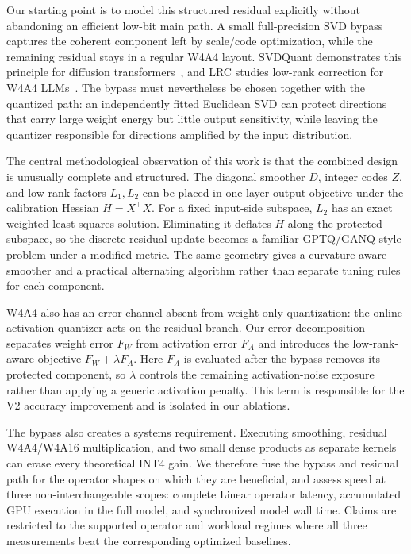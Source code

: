 \documentclass{article}
\begin{document}
Our starting point is to model this structured residual explicitly without
abandoning an efficient low-bit main path. A small full-precision SVD bypass
captures the coherent component left by scale/code optimization, while the
remaining residual stays in a regular W4A4 layout. SVDQuant demonstrates this principle
for diffusion transformers~\citep{li2024svdquant}, and LRC studies low-rank
correction for W4A4 LLMs~\citep{scetbon2024lrc}. The bypass must nevertheless be
chosen together with the quantized path: an independently fitted Euclidean SVD
can protect directions that carry large weight energy but little output
sensitivity, while leaving the quantizer responsible for directions amplified
by the input distribution.

The central methodological observation of this work is that the combined design
is unusually complete and structured. The diagonal smoother $D$, integer codes
$Z$, and low-rank factors $L_1,L_2$ can be placed in one layer-output objective
under the calibration Hessian $H=X^\top X$. For a fixed input-side subspace,
$L_2$ has an exact weighted least-squares solution. Eliminating it deflates $H$
along the protected subspace, so the discrete residual update becomes a familiar
GPTQ/GANQ-style problem under a modified metric. The same geometry gives a
curvature-aware smoother and a practical alternating algorithm rather than
separate tuning rules for each component.

W4A4 also has an error channel absent from weight-only quantization: the online
activation quantizer acts on the residual branch. Our error decomposition
separates weight error $F_W$ from activation error $F_A$ and introduces the
low-rank-aware objective $F_W+\lambda F_A$. Here $F_A$ is evaluated after the
bypass removes its protected component, so $\lambda$ controls the remaining
activation-noise exposure rather than applying a generic activation penalty.
This term is responsible for the V2 accuracy improvement and is isolated in our
ablations.

The bypass also creates a systems requirement. Executing smoothing, residual
W4A4/W4A16 multiplication, and two small dense products as separate kernels can
erase every theoretical INT4 gain. We therefore fuse the bypass and residual
path for the operator shapes on which they are beneficial, and assess speed at
three non-interchangeable scopes: complete Linear operator latency, accumulated
GPU execution in the full model, and synchronized model wall time. Claims are
restricted to the supported operator and workload regimes where all three
measurements beat the corresponding optimized baselines.
\end{document}
